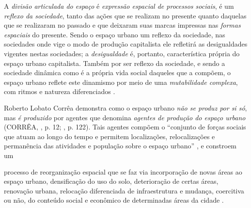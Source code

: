 A \textit{divisão articulada do espaço} é \textit{expressão espacial de processos sociais}, é um \textit{reflexo da sociedade}, tanto das ações que se realizam no presente quanto daquelas que se realizaram no passado e que deixaram suas marcas impressas nas \textit{formas espaciais} do presente. Sendo o espaço urbano um reflexo da sociedade, nas sociedades onde vige o modo de produção capitalista ele refletirá as desigualdades vigentes nestas sociedades; a \textit{desigualdade} é, portanto, característica própria do espaço urbano capitalista. Também por ser reflexo da sociedade, e sendo a sociedade dinâmica como é a própria vida social daqueles que a compõem, o espaço urbano reflete este dinamismo por meio de uma \textit{mutabilidade complexa}, com ritmos e natureza diferenciados \cite[p.~8]{CORREA1985espa}.

Roberto Lobato Corrêa demonstra como o espaço urbano \textit{não se produz por si só}, mas \textit{é produzido} por agentes que denomina \textit{agentes de produção do espaço urbano} (CORRÊA, \citeyear{CORREA1985espa}, p. 12; \citeyear{CORREA1997}, p. 122). Tais agentes compõem o ``conjunto de forças sociais que atuam ao longo do tempo e permitem localizações, relocalizações e permanência das atividades e população sobre o espaço urbano'' \cite[p.~122]{CORREA1997}, e constroem um

\begin{citacao}
processo de reorganização espacial que se faz via incorporação de novas áreas ao espaço urbano, densificação do uso do solo, deterioração de certas áreas, renovação urbana, relocação diferenciada de infraestrutura e mudança, coercitiva ou não, do conteúdo social e econômico de determinadas áreas da cidade \cite[p.~11]{CORREA1985espa}.
\end{citacao}

